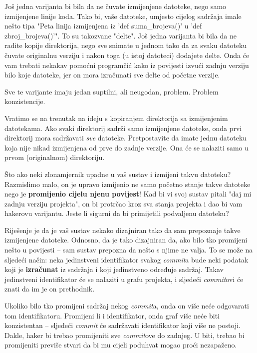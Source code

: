 Još jedna varijanta bi bila da ne čuvate izmijenjene datoteke, nego samo izmijenjene linije koda.
Tako bi, vaše datoteke, umjesto cijelog sadržaja imale nešto tipa "Peta linija izmijenjena iz 'def suma\_brojeva()' u 'def zbroj\_brojeva()'".
To su takozvane "delte".
Još jedna varijanta bi bila da ne radite kopije direktorija, nego sve snimate u jednom tako da za svaku datoteku čuvate originalnu verziju i nakon toga (u istoj datoteci) dodajete delte.
Onda će vam trebati nekakav pomoćni programčić kako iz povijesti izvući zadnju verziju bilo koje datoteke, jer on mora izračunati sve delte od početne verzije.

Sve te varijante imaju jedan suptilni, ali neugodan, problem.
Problem konzistencije.

Vratimo se na trenutak na ideju s kopiranjem direktorija sa izmijenjenim datotekama.
Ako svaki direktorij sadrži samo izmijenjene datoteke, onda prvi direktorij mora sadržavati \emph{sve} datoteke.
Pretpostavite da imate jednu datoteku koja nije nikad izmijenjena od prve do zadnje verzije. 
Ona će se nalaziti samo u prvom (originalnom) direktoriju.

Što ako neki zlonamjernik upadne u vaš sustav i izmijeni takvu datoteku?
Razmislimo malo, on je upravo izmijenio ne samo početno stanje takve datoteke nego je \textbf{promijenio cijelu njenu povijest}!
Kad bi vi svoj sustav pitali "daj mi zadnju verziju projekta", on bi protrčao kroz sva stanja projekta i dao bi vam hakerovu varijantu.
Jeste li sigurni da bi primijetili podvaljenu datoteku?

Riješenje je da je vaš sustav nekako dizajniran tako da sam prepoznaje takve izmijenjene datoteke. 
Odnosno, da je tako dizajniran da, ako bilo tko promijeni nešto u povijesti -- sam sustav prepozna da nešto s njime ne valja.
To se može na sljedeći način: neka jedinstveni identifikator svakog \emph{commit}a bude neki podatak koji je \textbf{izračunat} iz sadržaja i koji jedinstveno određuje sadržaj.
Takav jedinstveni identifikator će se nalaziti u grafu projekta, i sljedeći \emph{commit}ovi će znati da im je on prethodnik.

Ukoliko bilo tko promijeni sadržaj nekog \emph{commit}a, onda on više neće odgovarati tom identifikatoru.
Promijeni li i identifikator, onda graf više neće biti konzistentan -- sljedeći \emph{commit} će sadržavati identifikator koji više ne postoji.
Dakle, haker bi trebao promijeniti sve \emph{commit}ove do zadnjeg. 
U biti, trebao bi promijeniti previše stvari da bi mu cijeli poduhvat mogao proći nezapaženo.

